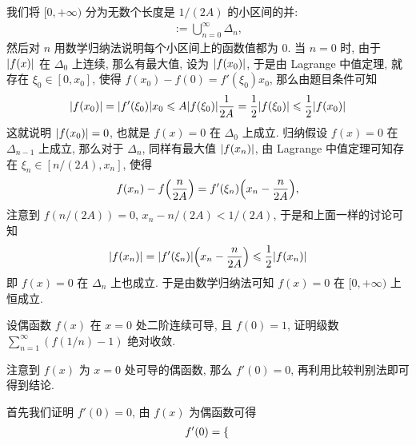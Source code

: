 \begin{exercise}[series=exer]
\begin{hint}
    \end{hint}
    \begin{answer}
        我们将 $ [0, +\infty) $ 分为无数个长度是 $ 1/(2A) $ 的小区间的并:
        \begin{align*}
            [0, +\infty) = \bigcup_{n = 0}^{\infty}\qty[\frac{n}{2A}, \frac{n + 1}{2A}] := \bigcup_{n = 0}^{\infty}\Delta_{n},
        \end{align*}
        然后对 $ n $ 用数学归纳法说明每个小区间上的函数值都为 $ 0 $. 当 $ n = 0 $ 时, 由于 $ \abs{f(x)} $ 在 $ \Delta_{0} $ 上连续, 那么有最大值, 设为 $ \abs{f(x_{0})} $, 于是由 Lagrange 中值定理, 就存在 $ \xi_{0} \in [0, x_{0}] $, 使得 $ f(x_{0}) - f(0) = f'(\xi_{0})x_{0} $, 那么由题目条件可知
        \begin{align*}
            \abs{f(x_{0})} = \abs{f'(\xi_{0})}x_{0} \leqslant A\abs{f(\xi_{0})}\frac{1}{2A} = \frac{1}{2}\abs{f(\xi_{0})} \leqslant \frac{1}{2}\abs{f(x_{0})} 
        \end{align*}
        这就说明 $ \abs{f(x_{0})} = 0 $, 也就是 $ f(x) = 0 $ 在 $ \Delta_{0} $ 上成立. 归纳假设 $ f(x) = 0 $ 在 $ \Delta_{n - 1} $ 上成立, 那么对于 $ \Delta_{n} $, 同样有最大值 $ \abs{f(x_{n})} $, 由 Lagrange 中值定理可知存在 $ \xi_{n} \in [n/(2A), x_{n}] $, 使得
        \begin{align*}
            f(x_{n}) - f\qty(\frac{n}{2A}) = f'(\xi_{n})\qty(x_{n} - \frac{n}{2A}),
        \end{align*}
        注意到 $ f(n/(2A)) = 0 $, $ x_{n} - n/(2A) < 1/(2A) $, 于是和上面一样的讨论可知
        \begin{align*}
            \abs{f(x_{n})} = \abs{f'(\xi_{n})}\qty(x_{n} - \frac{n}{2A}) \leqslant \frac{1}{2}\abs{f(x_{n})}
        \end{align*}
        即 $ f(x) = 0 $ 在 $ \Delta_{n} $ 上也成立. 于是由数学归纳法可知 $ f(x) = 0 $ 在 $ [0, +\infty) $ 上恒成立.
    \end{answer}
    \item 设偶函数 $ f(x) $ 在 $ x = 0 $ 处二阶连续可导, 且 $ f(0) = 1 $, 证明级数 $ \sum_{n = 1}^{\infty} (f(1/n) - 1) $ 绝对收敛.
    \begin{hint}
        注意到 $ f(x) $ 为 $ x = 0 $ 处可导的偶函数, 那么 $ f'(0) = 0 $, 再利用比较判别法即可得到结论.
    \end{hint}
    \begin{answer}
        首先我们证明 $ f'(0) = 0 $, 由 $ f(x) $ 为偶函数可得
        \begin{align*}
            f'(0) = \begin{dcases}

\end{dcases}
\end{align*}
\end{answer}
\end{exercise}
